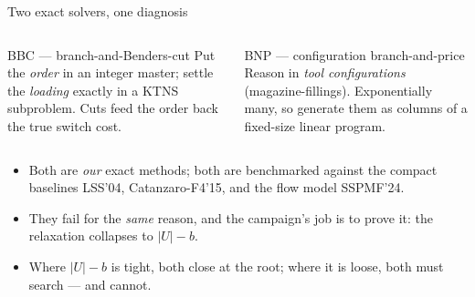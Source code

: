 \documentclass[10pt]{beamer}
\newcommand{\U}{U}\newcommand{\Kst}{K^{\ast}}\newcommand{\Zst}{Z^{\ast}}
\newcommand{\cov}{\lvert\U\rvert-b}
\begin{document}
\begin{frame}{Two exact solvers, one diagnosis}
\begin{columns}[T]
\begin{block}{BBC --- branch-and-Benders-cut}
Put the \emph{order} in an integer master; settle the \emph{loading} exactly in a
KTNS subproblem. Cuts feed the order back the true switch cost.
\end{block}
\begin{block}{BNP --- configuration branch-and-price}
Reason in \emph{tool configurations} (magazine-fillings). Exponentially many, so
generate them as columns of a fixed-size linear program.
\end{block}
\end{columns}
\vspace{2mm}
\begin{itemize}
  \item Both are \emph{our} exact methods; both are benchmarked against the compact
        baselines LSS'04, Catanzaro-F4'15, and the flow model SSPMF'24.
  \item They fail for the \emph{same} reason, and the campaign's job is to prove it:
        the relaxation collapses to $\cov$.
  \item Where $\cov$ is tight, both close at the root; where it is loose, both must
        search --- and cannot.
\end{itemize}
\end{frame}

\end{document}
